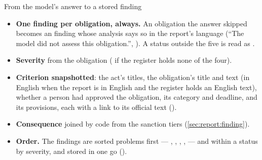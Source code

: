 \begin{codebox}{From the model's answer to a stored finding}
\begin{itemize}
  \item \textbf{One finding per obligation, always.} An obligation the answer skipped becomes
    an  finding whose analysis says so in the report's language
    (\enquote{The model did not assess this obligation.}, ). A status outside the five is read as .
  \item \textbf{Severity} from the obligation ( if the register holds none of the
    four).
  \item \textbf{Criterion snapshotted}: the act's titles, the obligation's title and text (in
    English when the report is in English and the register holds an English text), whether a
    person had approved the obligation, its category and deadline, and its provisions, each
    with a link to its official text ().
  \item \textbf{Consequence} joined by code from the sanction tiers (\cref{sec:report:finding}).
  \item \textbf{Order.} The findings are sorted problems first --- ,
    , , ,  --- and within a status by
    severity, and stored in one go ().
\end{itemize}
\end{codebox}

